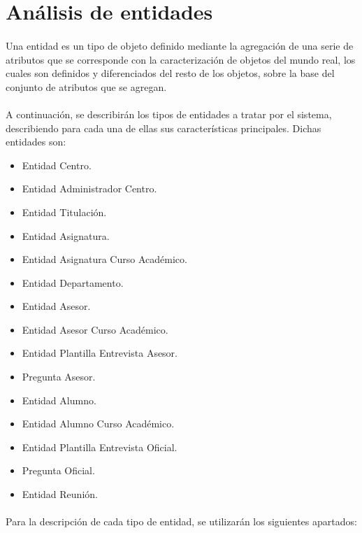 \section{Análisis de entidades}

   \paragraph{}Una entidad es un tipo de objeto definido mediante la agregación
   de una serie de atributos que se corresponde con la caracterización de
   objetos del mundo real, los cuales son definidos y diferenciados del resto de
   los objetos, sobre la base del conjunto de atributos que se agregan.

   \paragraph{}A continuación, se describirán los tipos de entidades a tratar
   por el sistema, describiendo para cada una de ellas sus características
   principales. Dichas entidades son:

   \begin{itemize}
    \item Entidad Centro.
    \item Entidad Administrador Centro.
    \item Entidad Titulación.
    \item Entidad Asignatura.
    \item Entidad Asignatura Curso Académico.
    \item Entidad Departamento.
    \item Entidad Asesor.
    \item Entidad Asesor Curso Académico.
    \item Entidad Plantilla Entrevista Asesor.
    \item Pregunta Asesor.
    \item Entidad Alumno.
    \item Entidad Alumno Curso Académico.
    \item Entidad Plantilla Entrevista Oficial.
    \item Pregunta Oficial.
    \item Entidad Reunión.
   \end{itemize}

   \paragraph{}Para la descripción de cada tipo de entidad, se utilizarán los
   siguientes apartados:

